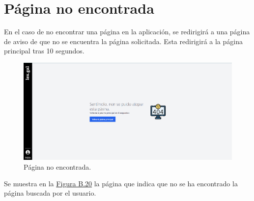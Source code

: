 \section{Página no encontrada}
\label{PNoEncontrada}

En el caso de no encontrar una página en la aplicación, se redirigirá a una página de aviso de que no se encuentra la página solicitada. Esta redirigirá a la página principal tras 10 segundos.

\begin{figure}[H]
\centerline{\includegraphics[width=15cm]{figuras/manualUsuario/NoEncontrada.PNG}}
\caption{Página no encontrada.}
\label{enlaceNoEncontrada}
\end{figure}

Se muestra en la \hyperref[enlaceNoEncontrada]{Figura B.20} la página que indica que no se ha encontrado la página buscada por el usuario.
